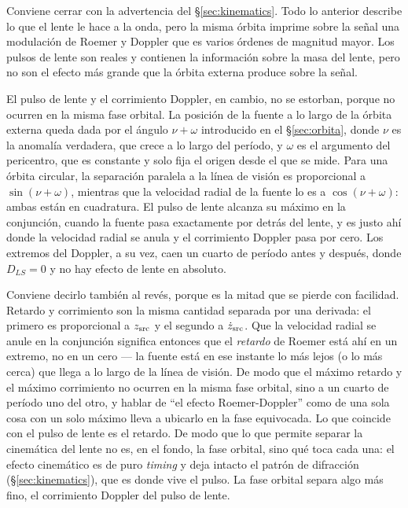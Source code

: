 \documentclass[11pt,a4paper,openany]{book}
\begin{document}
Conviene cerrar con la advertencia del \S\ref{sec:kinematics}. Todo lo
anterior describe lo que el lente le hace a la onda, pero la misma \'orbita
imprime sobre la se\~nal una modulaci\'on de Roemer y Doppler que es varios
\'ordenes de magnitud mayor. Los pulsos de lente son reales y contienen la
informaci\'on sobre la masa del lente, pero no son el efecto m\'as grande que
la \'orbita externa produce sobre la se\~nal.

El pulso de lente y el corrimiento Doppler, en cambio, no se estorban,
porque no ocurren en la misma fase orbital. La posici\'on de la fuente a lo largo de la \'orbita externa
queda dada por el \'angulo $\nu+\omega$ introducido en el
\S\ref{sec:orbita}, donde $\nu$ es la anomal\'ia verdadera, que crece a lo
largo del per\'iodo, y $\omega$ es el argumento del pericentro, que es
constante y solo fija el origen desde el que se mide. Para una \'orbita
circular, la separaci\'on paralela a la l\'inea de visi\'on es proporcional a
$\sin(\nu+\omega)$, mientras que la velocidad radial de la fuente lo es a
$\cos(\nu+\omega)$: ambas est\'an en cuadratura. El pulso de lente alcanza su m\'aximo en la conjunci\'on, cuando
la fuente pasa exactamente por detr\'as del lente, y es justo ah\'i donde la
velocidad radial se anula y el corrimiento Doppler pasa por cero. Los extremos
del Doppler, a su vez, caen un cuarto de per\'iodo antes y despu\'es, donde
$D_{LS}=0$ y no hay efecto de lente en absoluto.

Conviene decirlo tambi\'en al rev\'es, porque es la mitad que se pierde con
facilidad. Retardo y corrimiento son la misma cantidad separada por una
derivada: el primero es proporcional a $z_{\rm src}$ y el segundo a
$\dot z_{\rm src}$. Que la velocidad radial se anule en la conjunci\'on
significa entonces que el \emph{retardo} de Roemer est\'a ah\'i en un extremo,
no en un cero --- la fuente est\'a en ese instante lo m\'as lejos (o lo m\'as
cerca) que llega a lo largo de la l\'inea de visi\'on. De modo que el m\'aximo
retardo y el m\'aximo corrimiento no ocurren en la misma fase orbital, sino a
un cuarto de per\'iodo uno del otro, y hablar de ``el efecto Roemer-Doppler''
como de una sola cosa con un solo m\'aximo lleva a ubicarlo en la fase
equivocada. Lo que coincide con el pulso de lente es el retardo. De modo que lo que permite
separar la cinem\'atica del lente no es, en el fondo, la fase orbital, sino qu\'e
toca cada una: el efecto cinem\'atico es de puro \emph{timing} y deja intacto el
patr\'on de difracci\'on (\S\ref{sec:kinematics}), que es donde vive el pulso. La
fase orbital separa algo m\'as fino, el corrimiento Doppler del pulso de lente.
\end{document}
